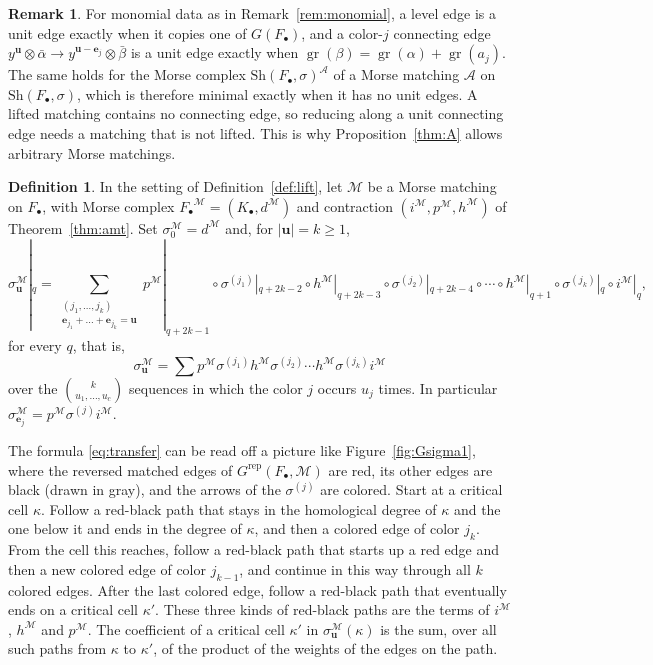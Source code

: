 \documentclass[12pt]{amsart}
\theoremstyle{plain}
\theoremstyle{definition}
\newtheorem{definition}[theorem]{Definition}
\newtheorem{remark}[theorem]{Remark}
\newcommand{\F}{ {F_\bullet} }
\newcommand{\M}{\mathcal{M}}
\newcommand{\A}{\mathcal{A}}
\newcommand{\Grep}{G^{\mathrm{rep}}}
\newcommand{\gr}{\operatorname{gr}}
\newcommand{\Sh}{\mathrm{Sh}}
\begin{document}
\begin{remark}\label{rem:notlifted}
    For monomial data as in Remark~\ref{rem:monomial}, a level edge is a unit edge exactly when it copies one of $G(\F)$, and a color-$j$ connecting edge $y^{\boldsymbol{u}} \otimes \bar\alpha \to y^{\boldsymbol{u} - \boldsymbol{e}_j} \otimes \bar\beta$ is a unit edge exactly when $\gr(\beta) = \gr(\alpha) + \gr(a_j)$. The same holds for the Morse complex $\Sh(\F, \sigma)^{\A}$ of a Morse matching $\A$ on $\Sh(\F, \sigma)$, which is therefore minimal exactly when it has no unit edges. A lifted matching contains no connecting edge, so reducing along a unit connecting edge needs a matching that is not lifted. This is why Proposition~\ref{thm:A} allows arbitrary Morse matchings.
\end{remark}


\begin{definition}\label{def:transferred}
In the setting of Definition~\ref{def:lift}, let $\M$ be a Morse matching on $\F$, with Morse complex $\F^{\M} = (K_\bullet, d^{\M})$ and contraction $(i^{\M}, p^{\M}, h^{\M})$ of Theorem~\ref{thm:amt}. Set $\sigma^{\M}_0 = d^{\M}$ and, for $|\boldsymbol{u}| = k \ge 1$,
    \begin{equation}\label{eq:transfer}
        \sigma^{\M}_{\boldsymbol{u}}|_q = \sum_{\substack{(j_1, \dots, j_k) \\ \boldsymbol{e}_{j_1} + \dots + \boldsymbol{e}_{j_k} = \boldsymbol{u}}} p^{\M}|_{q+2k-1} \circ \sigma^{(j_1)}|_{q+2k-2} \circ h^{\M}|_{q+2k-3} \circ \sigma^{(j_2)}|_{q+2k-4} \circ \cdots \circ h^{\M}|_{q+1} \circ \sigma^{(j_k)}|_q \circ i^{\M}|_q,
    \end{equation}
    for every $q$,
    that is,
    \[
        \sigma^{\M}_{\boldsymbol{u}} = \sum p^{\M} \sigma^{(j_1)} h^{\M} \sigma^{(j_2)} \cdots h^{\M} \sigma^{(j_k)} i^{\M}
    \]
    over the $\binom{k}{u_1, \dots, u_c}$ sequences in which the color $j$ occurs $u_j$ times.
    In particular $\sigma^{\M}_{\boldsymbol{e}_j} = p^{\M} \sigma^{(j)} i^{\M}$.
    \end{definition}

The formula \eqref{eq:transfer} can be read off a picture like Figure~\ref{fig:Gsigma1}, where the reversed matched edges of $\Grep(\F, \M)$ are red, its other edges are black (drawn in gray), and the arrows of the $\sigma^{(j)}$ are colored. Start at a critical cell $\kappa$. Follow a red-black path that stays in the homological degree of $\kappa$ and the one below it and ends in the degree of $\kappa$, and then a colored edge of color $j_k$. From the cell this reaches, follow a red-black path that starts up a red edge and then a new colored edge of color $j_{k-1}$, and continue in this way through all $k$ colored edges. After the last colored edge, follow a red-black path that eventually ends on a critical cell $\kappa'$. These three kinds of red-black paths are the terms of $i^{\M}$, $h^{\M}$ and $p^{\M}$.
The coefficient of a critical cell $\kappa'$ in $\sigma^{\M}_{\boldsymbol{u}}(\kappa)$ is the sum, over all such paths from $\kappa$ to $\kappa'$, of the product of the weights of the edges on the path.
\end{document}
